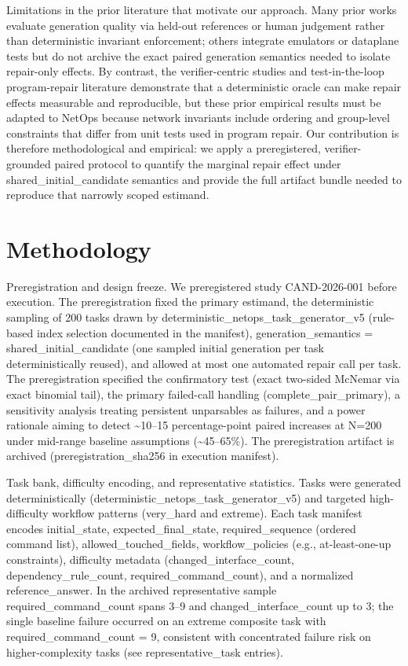 \documentclass[conference]{IEEEtran}
\begin{document}
Limitations in the prior literature that motivate our approach. Many prior works evaluate generation quality via held-out references or human judgement rather than deterministic invariant enforcement; others integrate emulators or dataplane tests but do not archive the exact paired generation semantics needed to isolate repair-only effects. By contrast, the verifier-centric studies and test-in-the-loop program-repair literature demonstrate that a deterministic oracle can make repair effects measurable and reproducible, but these prior empirical results must be adapted to NetOps because network invariants include ordering and group-level constraints that differ from unit tests used in program repair. Our contribution is therefore methodological and empirical: we apply a preregistered, verifier-grounded paired protocol to quantify the marginal repair effect under shared\_initial\_candidate semantics and provide the full artifact bundle needed to reproduce that narrowly scoped estimand.

\section{Methodology}
Preregistration and design freeze. We preregistered study CAND-2026-001 before execution. The preregistration fixed the primary estimand, the deterministic sampling of 200 tasks drawn by deterministic\_netops\_task\_generator\_v5 (rule-based index selection documented in the manifest), generation\_semantics = shared\_initial\_candidate (one sampled initial generation per task deterministically reused), and allowed at most one automated repair call per task. The preregistration specified the confirmatory test (exact two-sided McNemar via exact binomial tail), the primary failed-call handling (complete\_pair\_primary), a sensitivity analysis treating persistent unparsables as failures, and a power rationale aiming to detect \textasciitilde{}10--15 percentage-point paired increases at N=200 under mid-range baseline assumptions (\textasciitilde{}45--65\%). The preregistration artifact is archived (preregistration\_sha256 in execution manifest).

Task bank, difficulty encoding, and representative statistics. Tasks were generated deterministically (deterministic\_netops\_task\_generator\_v5) and targeted high-difficulty workflow patterns (very\_hard and extreme). Each task manifest encodes initial\_state, expected\_final\_state, required\_sequence (ordered command list), allowed\_touched\_fields, workflow\_policies (e.g., at-least-one-up constraints), difficulty metadata (changed\_interface\_count, dependency\_rule\_count, required\_command\_count), and a normalized reference\_answer. In the archived representative sample required\_command\_count spans 3--9 and changed\_interface\_count up to 3; the single baseline failure occurred on an extreme composite task with required\_command\_count = 9, consistent with concentrated failure risk on higher-complexity tasks (see representative\_task entries).
\end{document}
